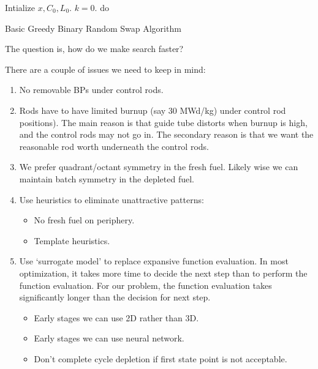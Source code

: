 \documentclass{school-22.211-notes}
\begin{document}

\begin{algorithm}
  \begin{algorithmic}
    \STATE Intialize $x, C_0, L_0$.  $k=0$. 
    \STATE do 
    \ENDWHILE
  \end{algorithmic}
  \caption{Basic Greedy Binary Random Swap Algorithm}
\end{algorithm}

The question is, how do we make search faster? 

There are a couple of issues we need to keep in mind: 

\begin{enumerate}

\item No removable BPs under control rods. 

\item Rods have to have limited burnup (say 30 MWd/kg) under control
  rod positions). The main reason is that guide tube distorts when
  burnup is high, and the control rods may not go in. The secondary
  reason is that we want the reasonable rod worth underneath the
  control rods.

\item We prefer quadrant/octant symmetry in the fresh fuel. Likely
  wise we can maintain batch symmetry in the depleted fuel.

\item Use heuristics to eliminate unattractive patterns: 
  \begin{itemize}
    \item No fresh fuel on periphery. 
    \item Template heuristics. 
  \end{itemize}

\item Use `surrogate model' to replace expansive function
  evaluation. In most optimization, it takes more time to decide the
  next step than to perform the function evaluation. For our problem,
  the function evaluation takes significantly longer than the decision
  for next step.
  \begin{itemize}
  \item Early stages we can use 2D rather than 3D.
  \item Early stages we can use neural network. 
  \item Don't complete cycle depletion if first state point is not
    acceptable. 
  \end{itemize}
\end{enumerate}
\end{document}
